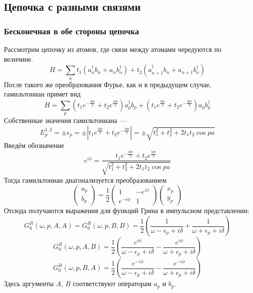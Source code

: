 \subsection{Цепочка с разными связями}
\subsubsection{Бесконечная в обе стороны цепочка}
Рассмотрим цепочку из атомов, где связи между атомами чередуются по величине.
\begin{equation}
	H = \sum_n t_1(a_n^\dagger b_n + a_n b_n^\dagger) + 
		t_2 (a_{n+1}^\dagger b_n + a_{n+1} b_n^\dagger)
\end{equation}
После такого же преобразования Фурье, как и в предыдущем случае, гамильтониан примет вид
\begin{equation}
	H = \sum_p 
			(t_1 e^{-\frac{ipa}{2}} + t_2 e^{\frac{ipa}{2}}) a_p^\dagger b_p + 
			(t_1 e^{\frac{ipa}{2}} + t_2 e^{-\frac{ipa}{2}}) a_p b_p^\dagger
\end{equation}
Собственные значения гамильтониана ---
\begin{equation}
	E_p^{1,2} = \pm \epsilon_p = \pm|t_1 e^{\frac{ipa}{2}} + t_2 e^{-\frac{ipa}{2}}| = 
		\pm\sqrt{t_1^2 + t_2^2 + 2t_1t_2 \cos{pa}}
\end{equation}
Введём обозначение 
\begin{equation}
	e^{i\phi} = \frac{t_1 e^{-\frac{ipa}{2}} + t_2 e^{\frac{ipa}{2}}}
				{\sqrt{t_1^2 + t_2^2 + 2t_1t_2 \cos{pa}}}
\end{equation}
Тогда гамильтониан диагонализуется преобразованием
\begin{equation}
	\left(
	\begin{matrix}
		a_p \\
		b_p
	\end{matrix}
	\right)
	=
	\frac12
	\left(
	\begin{matrix}
		1 & -e^{i\phi}	\\
		e^{-i\phi} & 1
	\end{matrix}
	\right)
	\left(
	\begin{matrix}
		x_p \\
		y_p
	\end{matrix}
	\right)
\end{equation}
Отсюда получаются выражения для функций Грина в импульсном представлении:
\begin{equation}
	\label{gaa}
	G^R_0 (\omega, p, A, A) =  G^R_0 (\omega, p, B, B) = \frac{1}{2}\left(
		\frac{1}{\omega - \epsilon_p + i\delta} + 
					\frac{1}{\omega + \epsilon_p + i\delta}\right)
\end{equation}
\begin{equation}
	G^R_0 (\omega, p, A, B) = \frac12 \left(\frac{e^{i\phi}}{\omega - \epsilon_p + i\delta} -
						\frac{e^{i\phi}}{\omega + \epsilon_p + i\delta} \right)
\end{equation}
\begin{equation}
	G^R_0 (\omega, p, B, A) = \frac12 \left(\frac{e^{-i\phi}}{\omega - \epsilon_p + i\delta} -
						\frac{e^{-i\phi}}{\omega + \epsilon_p + i\delta} \right)
\end{equation}
Здесь аргументы $A$, $B$ соответствуют операторам $a_p$ и $b_p$. 
